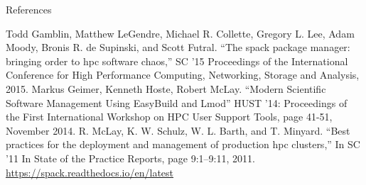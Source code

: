 \documentclass[final]{beamer}
\newlength{\onecolwid}
\begin{document}
\begin{frame}[t]
\begin{columns}[t]
\begin{column}{\onecolwid}
\begin{block}{References}

\nocite{*} %
\small{

\begin{thebibliography}{00}
 Todd Gamblin, Matthew LeGendre, Michael R. Collette, Gregory L. Lee, Adam Moody, Bronis R. de Supinski, and Scott Futral. ``The spack package manager: bringing order to hpc software chaos,'' SC ’15 Proceedings of the International Conference for High Performance Computing, Networking, Storage and Analysis, 2015.
 Markus Geimer, Kenneth Hoste, Robert McLay. ``Modern Scientific Software Management Using EasyBuild and Lmod'' HUST '14: Proceedings of the First International Workshop on HPC User Support Tools, page 41-51, November 2014.
 R. McLay, K. W. Schulz, W. L. Barth, and T. Minyard. ``Best practices for the deployment and management of production hpc clusters,'' In SC ’11 In State of the Practice Reports, page 9:1–9:11, 2011.
 \href{https://spack.readthedocs.io/en/latest}{https://spack.readthedocs.io/en/latest}
\end{thebibliography}
}

\end{block}



\end{column}
\end{columns}
\end{frame}
\end{document}
